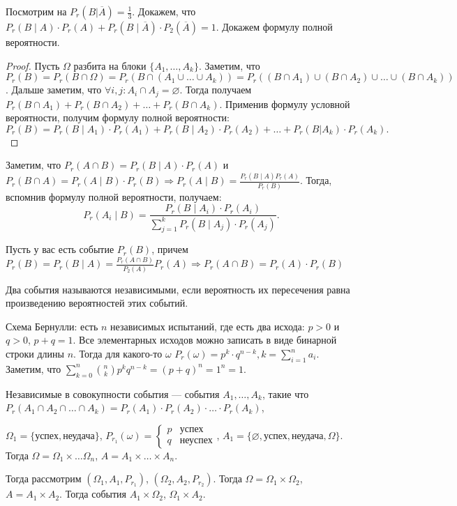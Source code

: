 Посмотрим на $P_r(B | \overline{A}) = \frac{1}{3}$. Докажем, что $P_r(B \mid A) \cdot P_r(A) + P_r(B \mid \overline{A}) \cdot P_2(\overline{A}) = 1$.
Докажем формулу полной вероятности.
 \begin{proof}
     Пусть $\Omega$ разбита на блоки  $\{A_1,\ldots,A_k\}$. Заметим, что $P_r(B) = P_r(B \cap \Omega) = P_r(B \cap (A_1 \cup \ldots \cup A_k)) = P_r((B \cap A_1) \cup (B \cap A_2) \cup \ldots \cup (B \cap A_k))$. Дальше заметим, что $\forall i, j: A_i \cap A_j = \varnothing$. Тогда получаем $P_r(B \cap A_1) + P_r(B \cap A_2) + \ldots + P_r(B \cap A_k)$. Применив формулу условной вероятности, получим формулу полной вероятности: \[
         P_r(B) = P_r(B \mid A_1) \cdot P_r(A_1) + P_r(B \mid A_2) \cdot P_r(A_2) + \ldots + P_r(B | A_k) \cdot P_r(A_k)
     .\] 
\end{proof}
Заметим, что $P_r(A \cap B) = P_r(B \mid A) \cdot P_r(A)$ и  $P_r(B \cap A) = P_r(A \mid B) \cdot P_r(B) \Rightarrow P_r(A\mid B) = \frac{P_r(B \mid A) P_r(A)}{P_r(B)}$. Тогда, вспомнив формулу полной вероятности, получаем: \[
    P_r(A_i \mid B) = \frac{P_r(B \mid A_i) \cdot P_r(A_i)}{\sum_{j=1}^k P_r(B \mid A_j) \cdot P_r(A_j)}
.\] 

Пусть у вас есть событие $P_r(B)$, причем  $P_r(B) = P_r(B \mid A) = \frac{P_r(A \cap B)}{P_2(A)}P_r(A) \Rightarrow P_r(A \cap B) = P_r(A) \cdot P_r(B)$

 \begin{definition}
    Два события называются независимыми, если вероятность их пересечения равна произведению вероятностей этих событий.
\end{definition}
\slashn
Схема Бернулли: есть $n$ независимых испытаний, где есть два исхода:  $p>0$ и  $q>0$,  $p+q=1$. Все элементарных исходов можно записать в виде бинарной строки длины  $n$.  Тогда для какого-то $\omega$  $P_r(\omega) = p^k \cdot q^{n-k}, k = \sum_{i=1}^n a_i$. Заметим, что  $\sum_{k=0}^n \binom{n}{k}p^kq^{n-k} = (p+q)^n = 1^n = 1$. 
\begin{definition}
    Независимые в совокупности события --- события  $A_1, \ldots, A_k$, такие что $P_r(A_1 \cap A_2 \cap \ldots \cap A_k) = P_r(A_1) \cdot P_r(A_2) \cdot \ldots \cdot P_r(A_k)$,
\end{definition}
\slashn
$\Omega_1 = \{\text{успех},\text{неудача}\}$, $P_{r_1}(\omega) = \begin{cases} p & \text{успех} \\ q & \text{неуспех} \end{cases}$,  $A_1 = \{ \varnothing, \text{успех}, \text{неудача}, \Omega\}$. Тогда $\Omega = \Omega_1 \times \ldots \Omega_n$, $A = A_1 \times \ldots \times A_n$. 

Тогда рассмотрим $(\Omega_1, A_1, P_{r_1})$, $(\Omega_2, A_2, P_{r_2})$. Тогда $\Omega = \Omega_1 \times \Omega_2$, $A = A_1 \times A_2$. Тогда события $A_1 \times \Omega_2$, $\Omega_1 \times A_2$.
